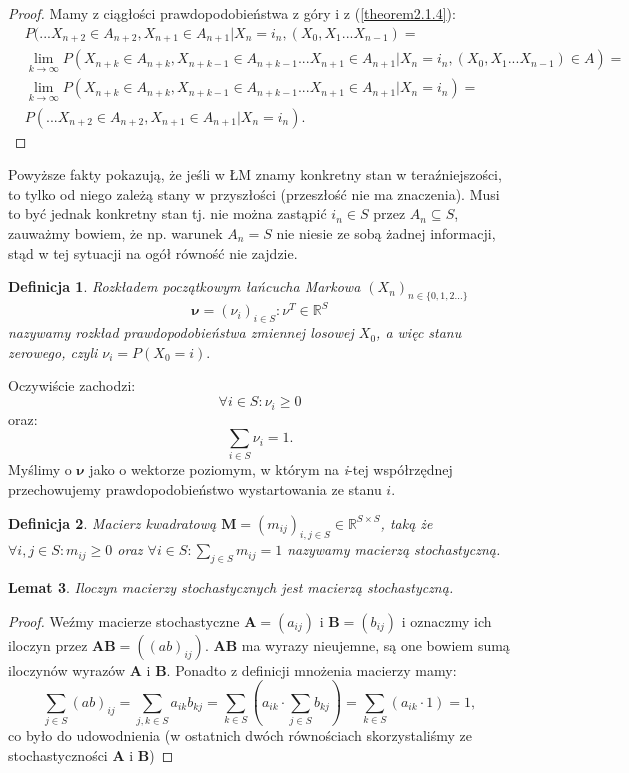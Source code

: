 \documentclass[a4paper]{article}
\theoremstyle{defn}
\newtheorem{defn}{Definicja}[subsection]
\theoremstyle{theorem}
\theoremstyle{lemma}
\newtheorem{lemma}[defn]{Lemat}
\theoremstyle{cor}
\theoremstyle{fact}
\begin{document}
\begin{proof}
Mamy z ciągłości prawdopodobieństwa z góry i z (\ref{theorem2.1.4}):
\begin{align*}
&P(...X_{n+2} \in A_{n+2}, X_{n+1} \in A_{n+1}|X_n = i_n, (X_{0}, X_{1} ... X_{n-1}) =\\ &\lim_{k \to \infty} P(X_{n+k} \in A_{n+k}, X_{n+k-1} \in A_{n+k-1}...X_{n+1} \in A_{n+1}|X_n = i_n, (X_{0}, X_{1} ... X_{n-1}) \in A) = \\
&\lim_{k \to \infty} P(X_{n+k} \in A_{n+k}, X_{n+k-1} \in A_{n+k-1}...X_{n+1} \in A_{n+1}|X_n = i_n) = \\
&P(...X_{n+2} \in A_{n+2}, X_{n+1} \in A_{n+1}|X_n = i_n).
\end{align*}
\end{proof}
Powyższe fakty pokazują, że jeśli w ŁM znamy konkretny stan w teraźniejszości, to tylko od niego zależą stany w przyszłości (przeszłość nie ma znaczenia). Musi to być jednak konkretny stan tj. nie można zastąpić $i_n \in S$ przez $A_n \subseteq S$, zauważmy bowiem, że np. warunek $A_n = S$ nie niesie ze sobą żadnej informacji, stąd w tej sytuacji na ogół równość nie zajdzie.
\begin{defn}\label{defn2.1.6}
\textit{Rozkładem początkowym}  łańcucha Markowa $(X_n)_{n \in \{0,1,2...\}}$
$$\boldsymbol{\nu} = (\nu_i)_{i \in S}: \nu^T \in \mathbb{R}^S$$
nazywamy rozkład prawdopodobieństwa zmiennej losowej $X_0$, a więc stanu zerowego, czyli $\nu_i = P(X_0 = i).$
\end{defn}
 Oczywiście zachodzi:
 $$\forall i \in S: \nu_i \geq 0$$
 oraz:
 $$\sum\limits_{i \in S}\nu_i = 1.$$
 Myślimy o $\boldsymbol{\nu}$ jako o wektorze poziomym, w którym na \textit{i}-tej współrzędnej przechowujemy prawdopodobieństwo wystartowania ze stanu $i$.
\begin{defn}\label{2.1.7}
Macierz kwadratową $\boldsymbol{M} = (m_{ij})_{i,j \in S} \in \mathbb{R}^{S \times S}$, taką że $\forall i, j \in S: m_{ij} \geq 0$ oraz $\forall i \in S: \sum\limits_{j \in S} m_{ij} = 1$ nazywamy \textit{macierzą stochastyczną}.
\end{defn}
\begin{lemma}\label{lemma2.1.8}
Iloczyn macierzy stochastycznych jest macierzą stochastyczną.
\end{lemma}
\begin{proof}
Weźmy macierze stochastyczne $\boldsymbol{A}=(a_{ij})$ i $\boldsymbol{B}=(b_{ij})$ i oznaczmy ich iloczyn przez $\boldsymbol{AB} = ((ab)_{ij})$. $\boldsymbol{AB}$ ma wyrazy nieujemne, są one bowiem sumą iloczynów wyrazów $\boldsymbol{A}$ i $\boldsymbol{B}$. Ponadto z definicji mnożenia macierzy mamy: $$\sum\limits_{j \in S} (ab)_{ij} = \sum\limits_{j, k \in S} a_{ik}b_{kj} = \sum\limits_{k \in S} (a_{ik} \cdot \sum\limits_{j \in S} b_{kj}) =  \sum\limits_{k \in S} (a_{ik} \cdot 1) = 1,$$ co było do udowodnienia (w ostatnich dwóch równościach skorzystaliśmy ze stochastyczności $\boldsymbol{A}$ i $\boldsymbol{B}$) \end{proof}
\end{document}
